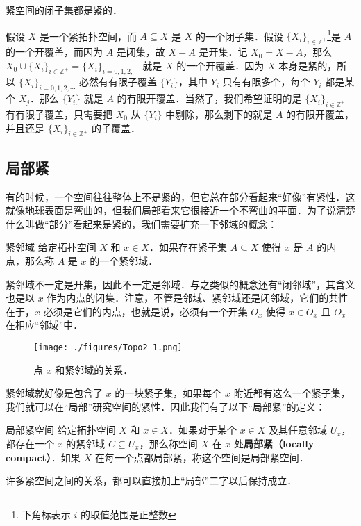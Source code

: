 \begin{theorem}{}\label{Topo2_the2}
紧空间的闭子集都是紧的．
\end{theorem}

假设 $X$ 是一个紧拓扑空间，而 $A\subseteq X$ 是 $X$ 的一个闭子集．假设 $\{X_i\}_{i\in \mathbb{Z}^+}$\footnote{下角标表示 $i$ 的取值范围是正整数}是 $A$ 的一个开覆盖，而因为 $A$ 是闭集，故 $X-A$ 是开集．记 $X_0=X-A$，那么 $X_0\cup\{X_i\}_{i\in \mathbb{Z}^+}=\{X_i\}_{i=0, 1, 2, \cdots}$ 就是 $X$ 的一个开覆盖．因为 $X$ 本身是紧的，所以 $\{X_i\}_{i=0, 1, 2, \cdots}$ 必然有有限子覆盖 $\{Y_i\}$，其中 $Y_i$ 只有有限多个，每个 $Y_i$ 都是某个 $X_j$．那么 $\{Y_i\}$ 就是 $A$ 的有限开覆盖．当然了，我们希望证明的是 $\{X_i\}_{i\in \mathbb{Z}^+}$ 有有限子覆盖，只需要把 $X_0$ 从 $\{Y_i\}$ 中剔除，那么剩下的就是 $A$ 的有限开覆盖，并且还是 $\{X_i\}_{i\in \mathbb{Z}^+}$ 的子覆盖．

\subsection{局部紧}

有的时候，一个空间往往整体上不是紧的，但它总在部分看起来“好像”有紧性．这就像地球表面是弯曲的，但我们局部看来它很接近一个不弯曲的平面．为了说清楚什么叫做“部分”看起来是紧的，我们需要扩充一下邻域的概念：

\begin{definition}{紧邻域}
给定拓扑空间 $X$ 和 $x\in X$．如果存在紧子集 $A\subseteq X$ 使得 $x$ 是 $A$ 的内点，那么称 $A$ 是 $x$ 的一个紧邻域．
\end{definition}

紧邻域不一定是开集，因此不一定是邻域．与之类似的概念还有“闭邻域”，其含义也是以 $x$ 作为内点的闭集．注意，不管是邻域、紧邻域还是闭邻域，它们的共性在于，$x$ 必须是它们的内点，也就是说，必须有一个开集 $O_x$ 使得 $x\in O_x$ 且 $O_x$ 在相应“邻域”中．

\begin{figure}[ht]
\centering
\texttt{[image: ./figures/Topo2\_1.png]}
\caption{点 $x$ 和紧邻域的关系．} \label{Topo2_fig1}
\end{figure}

紧邻域就好像是包含了 $x$ 的一块紧子集，如果每个 $x$ 附近都有这么一个紧子集，我们就可以在“局部”研究空间的紧性．因此我们有了以下“局部紧”的定义：

\begin{definition}{局部紧空间}
给定拓扑空间 $X$ 和 $x\in X$．如果对于某个 $x\in X$ 及其任意邻域 $U_x$，都存在一个 $x$ 的紧邻域 $C\subseteq U_x$，那么称空间 $X$ 在 $x$ 处\textbf{局部紧（locally compact）}．如果 $X$ 在每一个点都局部紧，称这个空间是局部紧空间．
\end{definition}

许多紧空间之间的关系，都可以直接加上“局部”二字以后保持成立．